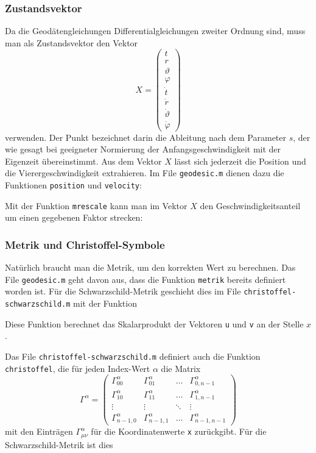 \subsubsection{Zustandsvektor}
Da die Geodätengleichungen Differentialgleichungen zweiter Ordnung sind,
muss man als Zustandsvektor den Vektor
\[
X=\begin{pmatrix}
t\\r\\\vartheta\\\varphi \\\dot t\\\dot r\\\dot \vartheta\\\dot\varphi
\end{pmatrix}
\]
verwenden.
Der Punkt bezeichnet darin die Ableitung nach dem Parameter $s$, der
wie gesagt bei geeigneter Normierung der Anfangsgeschwindigkeit mit
der Eigenzeit übereinstimmt.
Aus dem Vektor $X$ lässt sich jederzeit die Position und die
Vierergeschwindigkeit extrahieren.
Im File \texttt{geodesic.m} dienen dazu die Funktionen
\texttt{position} und \texttt{velocity}:

Mit der Funktion \texttt{mrescale} kann man im Vektor $X$ den
Geschwindigkeitsanteil um einen gegebenen Faktor strecken:


\subsubsection{Metrik und Christoffel-Symbole}
Natürlich braucht man die Metrik, um den korrekten Wert zu berechnen.
Das File \texttt{geodesic.m} geht davon aus, dass die Funktion \texttt{metrik}
bereits definiert worden ist.
Für die Schwarzschild-Metrik geschieht dies im File
\texttt{christoffel-schwarzschild.m} mit der Funktion

Diese Funktion berechnet das Skalarprodukt der Vektoren \texttt{u} und
\texttt{v} an der Stelle $x$.

Das File \texttt{christoffel-schwarzschild.m} definiert auch die Funktion
\texttt{christoffel}, die für jeden Index-Wert $\alpha$ die Matrix
\[
\Gamma^\alpha
=
\begin{pmatrix}
\Gamma^\alpha_{00}   &\Gamma^\alpha_{01}   &\dots &\Gamma^\alpha_{0,n-1}  \\
\Gamma^\alpha_{10}   &\Gamma^\alpha_{11}   &\dots &\Gamma^\alpha_{1,n-1}  \\
\vdots               &\vdots               &\ddots&\vdots                 \\
\Gamma^\alpha_{n-1,0}&\Gamma^\alpha_{n-1,1}&\dots &\Gamma^\alpha_{n-1,n-1}
\end{pmatrix}
\]
mit
den Einträgen $\Gamma^\alpha_{\mu\nu}$ für die Koordinatenwerte \texttt{x}
zurückgibt.
Für die Schwarzschild-Metrik ist dies


